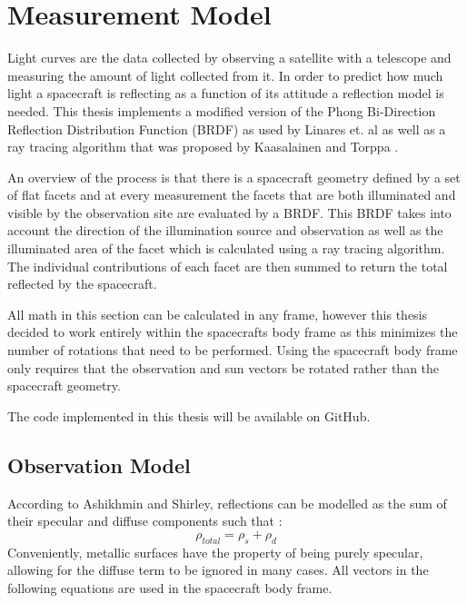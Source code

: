 \chapter{Measurement Model}


Light curves are the data collected by observing a satellite with a telescope and measuring the amount of light collected from it. In order to predict how much light a spacecraft is reflecting as a function of its attitude a reflection model is needed. This thesis implements a modified version of the Phong Bi-Direction Reflection Distribution Function (BRDF) as used by Linares et. al \cite{Linares_data_fusion} as well as a ray tracing algorithm that was proposed by Kaasalainen and Torppa \cite{kaasalainen_LCI}.

An overview of the process is that there is a spacecraft geometry defined by a set of flat facets and at every measurement the facets that are both illuminated and visible by the observation site are evaluated by a BRDF. This BRDF takes into account the direction of the illumination source and observation as well as the illuminated area of the facet which is calculated using a ray tracing algorithm. The individual contributions of each facet are then summed to return the total reflected by the spacecraft.

All math in this section can be calculated in any frame, however this thesis decided to work entirely within the spacecrafts body frame as this minimizes the number of rotations that need to be performed. Using the spacecraft body frame only requires that the observation and sun vectors be rotated rather than the spacecraft geometry.

The code implemented in this thesis will be available on GitHub.

\section{Observation Model}

According to Ashikhmin and Shirley, reflections can be modelled as the sum of their specular and diffuse components such that \cite{phong_brdf}:
\begin{equation}\label{PHONG1}
\rho_{total} = \rho_s + \rho_d
\end{equation}
Conveniently, metallic surfaces have the property of being purely specular, allowing for the diffuse term to be ignored in many cases\cite{phong_brdf}. All vectors in the following equations are used in the spacecraft body frame.

